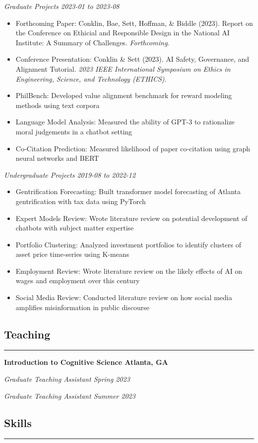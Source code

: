 \documentclass{article}
\newcommand{\headingOne}[1]{
    \subsection*{#1} \hrule
    \vspace*{6pt}
}
\newcommand{\headingTwo}[2]{
    \vspace*{6pt}
    \textbf{#1 \hfill #2}
}
\newcommand{\headingThree}[2]{
    \vspace*{2pt}
    \textsl{#1 \hfill #2}
}
\begin{document}
\headingThree{Graduate Projects}{2023-01 to 2023-08}
\begin{itemize}
    \item Forthcoming Paper: Conklin, Bae, Sett, Hoffman, \& Biddle (2023). Report on the Conference on Ethicial and Responsible Design in the National AI Institute: A Summary of Challenges. \textit{Forthcoming}.
    \item Conference Presentation: Conklin \& Sett (2023). AI Safety, Governance, and Alignment Tutorial. \textit{2023 IEEE International Symposium on Ethics in Engineering, Science, and Technology (ETHICS)}.
    \item PhilBench: Developed value alignment benchmark for reward modeling methods using text corpora
    \item Language Model Analysis: Measured the ability of GPT-3 to rationalize moral judgements in a chatbot setting
    \item Co-Citation Prediction: Measured likelihood of paper co-citation using graph neural networks and BERT
\end{itemize}

\headingThree{Undergraduate Projects}{2019-08 to 2022-12}
\begin{itemize}
    \item Gentrification Forecasting: Built transformer model forecasting of Atlanta gentrification with tax data using PyTorch
    \item Expert Models Review: Wrote literature review on potential development of chatbots with subject matter expertise
    \item Portfolio Clustering: Analyzed investment portfolios to identify clusters of asset price time-series using K-means
    \item Employment Review: Wrote literature review on the likely effects of AI on wages and employment over this century
    \item Social Media Review: Conducted literature review on how social media amplifies misinformation in public discourse
\end{itemize}



\headingOne{Teaching}


\headingTwo{Introduction to Cognitive Science}{Atlanta, GA}

\headingThree{Graduate Teaching Assistant}{Spring 2023}

\headingThree{Graduate Teaching Assistant}{Summer 2023}


\headingOne{Skills}
\end{document}
